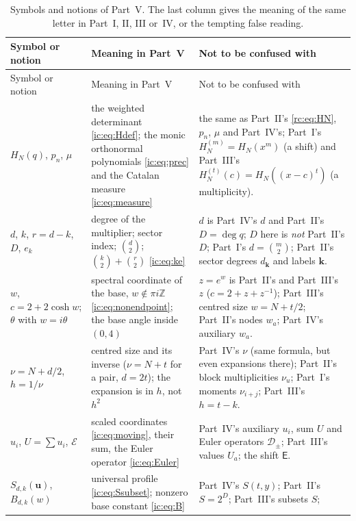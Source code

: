 \documentclass[11pt,a4paper]{article}
\numberwithin{equation}{section}
\theoremstyle{definition}
\theoremstyle{remark}
\newcommand{\ZZ}{\mathbb Z}
\newcommand{\bk}{\boldsymbol{k}}
\newcommand{\E}{\mathsf E}
\newcommand{\cH}[2]{H_{#1}^{(#2)}}
\newcommand{\bu}{\boldsymbol u}
\newcommand{\EE}{\mathcal E}
\begin{document}
\begingroup\small
\renewcommand{\arraystretch}{1.15}
\begin{longtable}{@{}>{\raggedright}p{}>{\raggedright}p{}>{\raggedright\arraybackslash}p{}@{}}
\caption{Symbols and notions of Part~V.  The last column gives the
meaning of the same letter in Part~I, II, III or~IV, or the tempting false
reading.}\label{ic:tab:notation}\\
\toprule
Symbol or notion & Meaning in Part~V & Not to be confused with\\
\midrule
\endfirsthead
\toprule
Symbol or notion & Meaning in Part~V & Not to be confused with\\
\midrule
\endhead
\bottomrule
\endfoot
$H_N(q)$, $p_n$, $\mu$
 & the weighted determinant \eqref{ic:eq:Hdef}; the monic orthonormal
   polynomials \eqref{ic:eq:prec} and the Catalan measure
   \eqref{ic:eq:measure}
 & the same as Part~II's \eqref{rc:eq:HN}, $p_n$, $\mu$ and Part~IV's;
   Part~I's $H_N^{(m)}=H_N(x^m)$ (a shift) and Part~III's
   $\cH Nt(c)=H_N((x-c)^t)$ (a multiplicity).\\
$d$, $k$, $r=d-k$, $D$, $e_k$
 & degree of the multiplier; sector index; $\binom d2$; $\binom k2+\binom r2$
   \eqref{ic:eq:ke}
 & $d$ is Part~IV's $d$ and Part~II's $D=\deg q$; $D$ here is \emph{not}
   Part~II's $D$; Part~I's $d=\binom m2$; Part~II's sector degrees
   $d_{\bk}$ and labels $\bk$.\\
$w$, $c=2+2\cosh w$; $\theta$ with $w=i\theta$
 & spectral coordinate of the base, $w\notin\pi i\ZZ$
   \eqref{ic:eq:nonendpoint}; the base angle inside $(0,4)$
 & $z=e^w$ is Part~II's and Part~III's $z$ ($c=2+z+z^{-1}$); Part~III's
   centred size $w=N+t/2$; Part~II's nodes $w_a$; Part~IV's auxiliary
   $w_a$.\\
$\nu=N+d/2$, $h=1/\nu$
 & centred size and its inverse ($\nu=N+t$ for a pair, $d=2t$); the
   expansion is in $h$, not $h^2$
 & Part~IV's $\nu$ (same formula, but even expansions there); Part~II's
   block multiplicities $\nu_u$; Part~I's moments $\nu_{i+j}$;
   Part~III's $h=t-k$.\\
$u_i$, $U=\sum u_i$, $\EE$
 & scaled coordinates \eqref{ic:eq:moving}, their sum, the Euler operator
   \eqref{ic:eq:Euler}
 & Part~IV's auxiliary $u_i$, sum $U$ and Euler operators
   $\mathcal D_\pm$; Part~III's values $U_a$; the shift $\E$.\\
$S_{d,k}(\bu)$, $B_{d,k}(w)$
 & universal profile \eqref{ic:eq:Ssubset}; nonzero base constant
   \eqref{ic:eq:B}
 & Part~IV's $S(t,y)$; Part~II's $S=2^D$; Part~III's subsets $S$;

\end{longtable}
\end{document}
